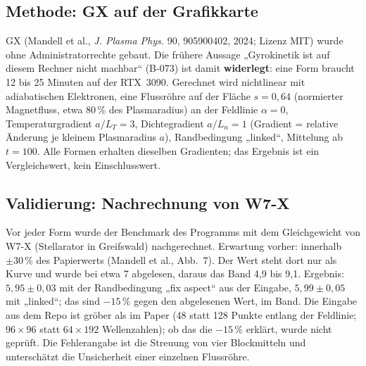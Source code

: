 \subsection{Methode: GX auf der Grafikkarte}
GX (Mandell et al., \emph{J. Plasma Phys.} 90, 905900402, 2024; Lizenz MIT) wurde ohne Administratorrechte gebaut. Die frühere Aussage „Gyrokinetik ist auf diesem Rechner nicht machbar“ (B-073) ist damit \textbf{widerlegt}:
eine Form braucht 12 bis 25 Minuten auf der RTX~3090. Gerechnet wird nichtlinear mit adiabatischen Elektronen, eine Flussröhre auf der Fläche $s=0{,}64$ (normierter Magnetfluss, etwa 80\,\% des Plasmaradius) an der Feldlinie $\alpha=0$,
Temperaturgradient $a/L_T=3$, Dichtegradient $a/L_n=1$ (Gradient = relative Änderung je kleinem Plasmaradius $a$), Randbedingung „linked“, Mittelung ab $t=100$.
Alle Formen erhalten dieselben Gradienten; das Ergebnis ist ein Vergleichswert, kein Einschlusswert.

\subsection{Validierung: Nachrechnung von W7-X}
Vor jeder Form wurde der Benchmark des Programms mit dem Gleichgewicht von W7-X (Stellarator in Greifswald) nachgerechnet. Erwartung vorher: innerhalb $\pm30\,\%$ des Papierwerts (Mandell et al., Abb.~7). Der Wert steht dort nur als Kurve und
wurde bei etwa 7 abgelesen, daraus das Band 4,9 bis 9,1. Ergebnis: $5{,}95\pm0{,}03$ mit der Randbedingung „fix aspect“ aus der Eingabe, $5{,}99\pm0{,}05$ mit „linked“; das sind $-15\,\%$ gegen den abgelesenen Wert, im Band. Die Eingabe aus dem Repo ist gröber als im Paper (48 statt 128 Punkte entlang der Feldlinie; $96\times96$ statt $64\times192$ Wellenzahlen); ob das die $-15\,\%$ erklärt, wurde nicht geprüft.
Die Fehlerangabe ist die Streuung von vier Blockmitteln und unterschätzt die Unsicherheit einer einzelnen Flussröhre.

